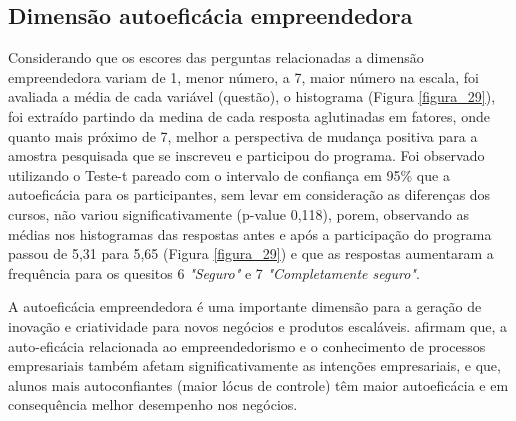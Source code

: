 





\subsection{Dimensão autoeficácia empreendedora}

Considerando que os escores das perguntas relacionadas a dimensão empreendedora variam de 1, menor número, a 7, maior número na escala, foi avaliada a média de cada variável (questão),
o histograma (Figura \ref{figura_29}), foi extraído partindo da medina de cada resposta aglutinadas em fatores, onde quanto mais próximo de 7, melhor a perspectiva de mudança positiva para a amostra pesquisada que se inscreveu e participou do programa. Foi observado utilizando o Teste-t pareado com o intervalo de confiança em 95\%  que a autoeficácia para os participantes, sem levar em consideração as diferenças dos cursos, não variou significativamente (p-value 0,118), porem, observando as médias nos histogramas das respostas antes e após a participação do programa passou de 5,31 para 5,65 (Figura \ref{figura_29}) e que as respostas aumentaram a frequência para os quesitos 6 \textit{"Seguro"} e 7 \textit{"Completamente seguro"}.

A autoeficácia empreendedora é uma importante dimensão para a geração de inovação e criatividade para novos negócios e produtos escaláveis.  afirmam que, a auto-eficácia relacionada ao empreendedorismo e o conhecimento de processos empresariais também afetam significativamente as intenções empresariais, e que, alunos mais autoconfiantes (maior lócus de controle) têm maior autoeficácia e em consequência melhor desempenho nos negócios.


